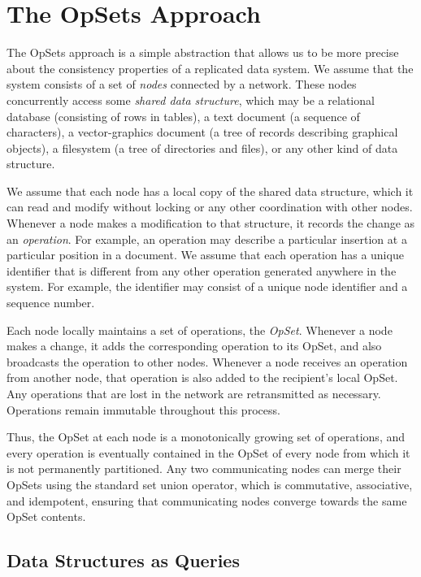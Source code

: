 \section{The OpSets Approach}\label{sec:approach}

The OpSets approach is a simple abstraction that allows us to be more precise about the consistency properties of a replicated data system.
We assume that the system consists of a set of \emph{nodes} connected by a network.
These nodes concurrently access some \emph{shared data structure}, which may be a relational database (consisting of rows in tables), a text document (a sequence of characters), a vector-graphics document (a tree of records describing graphical objects), a filesystem (a tree of directories and files), or any other kind of data structure.

We assume that each node has a local copy of the shared data structure, which it can read and modify without locking or any other coordination with other nodes.
Whenever a node makes a modification to that structure, it records the change as an \emph{operation}.
For example, an operation may describe a particular insertion at a particular position in a document.
We assume that each operation has a unique identifier that is different from any other operation generated anywhere in the system.
For example, the identifier may consist of a unique node identifier and a sequence number.

Each node locally maintains a set of operations, the \emph{OpSet}.
Whenever a node makes a change, it adds the corresponding operation to its OpSet, and also broadcasts the operation to other nodes.
Whenever a node receives an operation from another node, that operation is also added to the recipient's local OpSet.
Any operations that are lost in the network are retransmitted as necessary.
Operations remain immutable throughout this process.

Thus, the OpSet at each node is a monotonically growing set of operations, and every operation is eventually contained in the OpSet of every node from which it is not permanently partitioned.
Any two communicating nodes can merge their OpSets using the standard set union operator, which is commutative, associative, and idempotent, ensuring that communicating nodes converge towards the same OpSet contents.

\subsection{Data Structures as Queries}\label{sec:queries}

